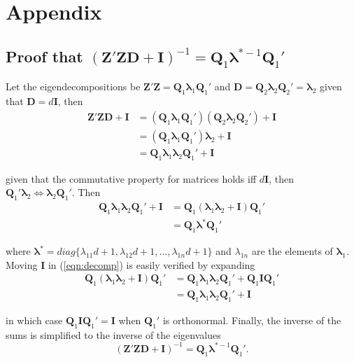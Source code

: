 \documentclass[12pt]{article}
\begin{document}
\newpage
\section*{Appendix}

\subsection*{Proof that $(\bm{Z}'\bm{Z}\bm{D} + \bm{I})^{-1} = \bm{Q}_1 \bm{\lambda}^{*-1} \bm{Q}_1'$}

Let the eigendecompositions be $\bm{Z}'\bm{Z} = \bm{Q}_1 \bm{\lambda}_1 \bm{Q}_1'$ and $\bm{D}=\bm{Q}_2 \bm{\lambda}_2 \bm{Q}_2'= \bm{\lambda}_2$ given that $\bm{D}=d\bm{I}$, then
\begin{align}
\bm{Z}'\bm{Z}\bm{D} + \bm{I} & = (\bm{Q}_1 \bm{\lambda}_1 \bm{Q}_1')(\bm{Q}_2 \bm{\lambda}_2 \bm{Q}_2') + \bm{I}\\
		& = (\bm{Q}_1 \bm{\lambda}_1 \bm{Q}_1')\bm{\lambda}_2 + \bm{I}\\
		&= \bm{Q}_1 \bm{\lambda}_1\bm{\lambda}_2 \bm{Q}_1' + \bm{I}
\end{align}

\noindent given that the commutative property for matrices holds iff $d\bm{I}$, then $\bm{Q}_1'\bm{\lambda}_2 \Longleftrightarrow \bm{\lambda}_2\bm{Q}_1'$. Then
\begin{align}
\bm{Q}_1 \bm{\lambda}_1\bm{\lambda}_2 \bm{Q}_1' + \bm{I}	&= \bm{Q}_1 (\bm{\lambda}_1\bm{\lambda}_2+ \bm{I}) \bm{Q}_1' \label{eqn:decomp}\\
		&= \bm{Q}_1 \bm{\lambda}^* \bm{Q}_1'
\end{align}

\noindent where $\bm{\lambda}^* = diag\{\lambda_{11}d+1, \lambda_{12}d+1, \ldots, \lambda_{1n}d+1\}$ and $\lambda_{1n}$ are the elements of $\bm{\lambda}_1$. Moving $\bm{I}$ in (\ref{eqn:decomp}) is easily verified by expanding
\begin{align}
\bm{Q}_1 (\bm{\lambda}_1\bm{\lambda}_2 + \bm{I}) \bm{Q}_1' &= \bm{Q}_1 \bm{\lambda}_1\bm{\lambda}_2\bm{Q}_1' + \bm{Q}_1\bm{I}\bm{Q}_1'\\
		&=\bm{Q}_1 \bm{\lambda}_1\bm{\lambda}_2\bm{Q}_1' + \bm{I}
\end{align}

\noindent in which case $\bm{Q}_1\bm{I}\bm{Q}_1'=\bm{I}$ when $\bm{Q}_1'$ is orthonormal. Finally, the inverse of the sums is simplified to the inverse of the eigenvalues 
\begin{equation}
\label{eqn:efficient}
(\bm{Z}'\bm{Z}\bm{D} + \bm{I})^{-1} = \bm{Q}_1 \bm{\lambda}^{*-1} \bm{Q}_1'.
\end{equation}
\end{document}
